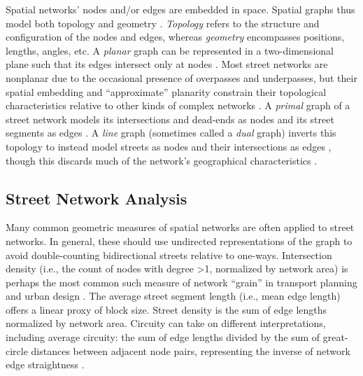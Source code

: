 \documentclass[12pt,letterpaper]{article} %
\begin{document}
Spatial networks' nodes and/or edges are embedded in space. Spatial graphs thus model both topology and geometry \citep{fischer_spatial_2014}. \textit{Topology} refers to the structure and configuration of the nodes and edges, whereas \textit{geometry} encompasses positions, lengths, angles, etc. A \textit{planar} graph can be represented in a two-dimensional plane such that its edges intersect only at nodes \citep{barthelemy_modeling_2008}. Most street networks are nonplanar due to the occasional presence of overpasses and underpasses, but their spatial embedding and \enquote{approximate} planarity constrain their topological characteristics relative to other kinds of complex networks \citep{boeing_planarity_2020}. A \textit{primal} graph of a street network models its intersections and dead-ends as nodes and its street segments as edges \citep{porta_network_2006-1}. A \textit{line} graph (sometimes called a \textit{dual} graph) inverts this topology to instead model streets as nodes and their intersections as edges \citep{porta_network_2006}, though this discards much of the network's geographical characteristics \citep{ratti_space_2004}.

\subsection{Street Network Analysis}

Many common geometric measures of spatial networks are often applied to street networks. In general, these should use undirected representations of the graph to avoid double-counting bidirectional streets relative to one-ways. Intersection density (i.e., the count of nodes with degree >1, normalized by network area) is perhaps the most common such measure of network \enquote{grain} in transport planning and urban design \citep[e.g.,][]{ewing_travel_2010}. The average street segment length (i.e., mean edge length) offers a linear proxy of block size. Street density is the sum of edge lengths normalized by network area. Circuity can take on different interpretations, including average circuity: the sum of edge lengths divided by the sum of great-circle distances between adjacent node pairs, representing the inverse of network edge straightness \citep{boeing_urban_2019}.
\end{document}
